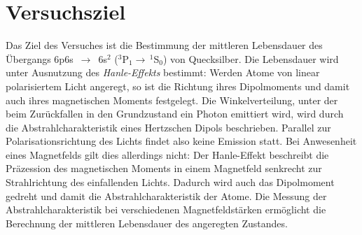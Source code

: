 \section{Versuchsziel}
Das Ziel des Versuches ist die Bestimmung der mittleren Lebensdauer des Übergangs
6p6s~$\rightarrow$~6s$^2$ ($^3$P$_1 \rightarrow \, ^1$S$_0$) von Quecksilber.
Die Lebensdauer wird unter Ausnutzung des \emph{Hanle-Effekts} bestimmt:
Werden Atome von linear polarisiertem Licht angeregt,
so ist die Richtung ihres Dipolmoments und damit auch ihres magnetischen Moments festgelegt.
Die Winkelverteilung, unter der beim Zurückfallen in den Grundzustand ein Photon emittiert wird,
wird durch die Abstrahlcharakteristik eines Hertzschen Dipols beschrieben.
Parallel zur Polarisationsrichtung des Lichts findet also keine Emission statt.
Bei Anwesenheit eines Magnetfelds gilt dies allerdings nicht:
Der Hanle-Effekt beschreibt die Präzession des magnetischen Moments in einem
Magnetfeld senkrecht zur Strahlrichtung des einfallenden Lichts.
Dadurch wird auch das Dipolmoment gedreht und damit die Abstrahlcharakteristik der Atome.
Die Messung der Abstrahlcharakteristik bei verschiedenen Magnetfeldstärken ermöglicht die
Berechnung der mittleren Lebensdauer des angeregten Zustandes.


